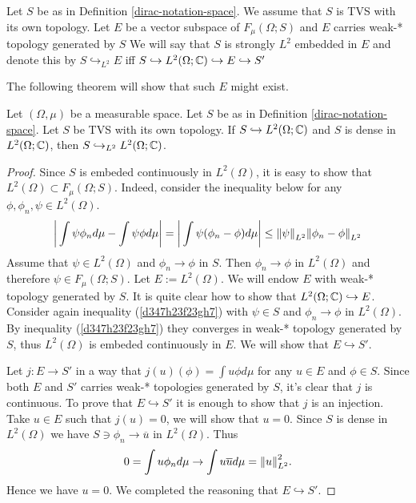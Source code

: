 \documentclass[main.tex]{subfiles}
\begin{document}
\begin{definition}
\label{strongly-embedded}
Let $S$ be as in Definition \ref{dirac-notation-space}. We assume that $S$ is TVS with its own topology. Let $E$ be a vector subspace of $F_\mu(\Omega; S)$ and $E$ carries weak-* topology generated by $S$
We will say that $S$ is strongly $L^2$ embedded in $E$ and denote this by $S\hookrightarrow_{L^2} E$  iff  
$S \hookrightarrow L^2(\Omega;\mathbb{C}) \hookrightarrow E \hookrightarrow S'$
\end{definition}

The following theorem will show that such $E$ might exist.

\begin{theorem}
Let $(\Omega, \mu)$ be a measurable space. Let $S$ be as in Definition \ref{dirac-notation-space}. Let $S$ be TVS with its own topology. If $S \hookrightarrow L^2(\Omega;\mathbb{C})$ and $S$ is dense in $L^2(\Omega;\mathbb{C})$, then $S\hookrightarrow_{L^2} L^2(\Omega;\mathbb{C})$.
\end{theorem}
\begin{proof}
Since $S$ is embeded continuously in $L^2(\Omega)$, it is easy to show that $L^2(\Omega) \subset F_\mu(\Omega; S)$. Indeed, consider the inequality below for any $\phi, \phi_n, \psi\in L^2(\Omega)$. 
\begin{equation}
\label{d347h23f23gh7}
\bigg| \int \psi \phi_nd\mu - \int\psi\phi d\mu \bigg| = \bigg| \int \psi (\phi_n - \phi) d\mu \bigg| \leq \norm{\psi}_{L^2} \norm{\phi_n - \phi}_{L^2} 
\end{equation}
Assume that $\psi\in L^2(\Omega)$ and $\phi_n\to \phi$ in $S$. Then $\phi_n\to \phi$ in $L^2(\Omega)$ and therefore $\psi\in F_\mu(\Omega; S)$. Let $E := L^2(\Omega)$. We will endow $E$ with weak-* topology generated by $S$.
It is quite clear how to show that $L^2(\Omega;\mathbb{C})\hookrightarrow E$. Consider again inequality (\ref{d347h23f23gh7}) with $\psi\in S$ and $\phi_n\to \phi$ in $L^2(\Omega)$. By inequality (\ref{d347h23f23gh7}) they converges in weak-* topology generated by $S$, thus $L^2(\Omega)$ is embeded continuously in $E$.
We will show that $E \hookrightarrow S'$.

Let $j:E\to S'$ in a way that $j(u)(\phi) = \int u\phi d\mu$ for any $u\in E$ and $\phi\in S$. Since both $E$ and $S'$ carries weak-* topologies generated by $S$, it's clear that $j$ is continuous. To prove that $E\hookrightarrow S'$ it is enough to show that $j$ is an injection. Take $u\in E$ such that $j(u) = 0$, we will show that $u = 0$. Since $S$ is dense in $L^2(\Omega)$ we have $S\ni \phi_n \to \overline{u}$ in $L^2(\Omega)$. Thus
\begin{equation}
0 = \int u\phi_n d\mu \to \int u\overline{u}d\mu = \norm{u}^2_{L^2}. 
\end{equation}
Hence we have $u = 0$. We completed the reasoning that $E \hookrightarrow S'$.
\end{proof}
\end{document}
